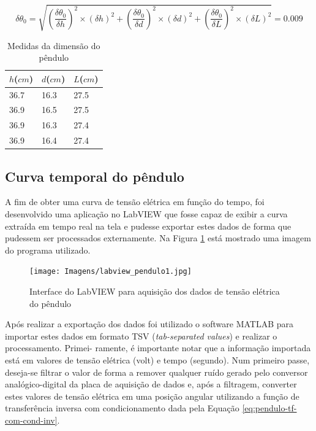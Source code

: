 \documentclass[a4paper]{instrumentacao}
\begin{document}
\begin{equation}
	\delta\theta_{0}= \sqrt{(\dfrac{\delta\theta_{0}}{\delta h})^2 \times (\delta h)^2 + (\dfrac{\delta\theta_{0}}{\delta d})^2 \times (\delta d)^2 + (\dfrac{\delta\theta_{0}}{\delta L})^2 \times (\delta L)^2} = 0.009
	\label{eq:pendulo-incerteza-calculada}
\end{equation}

\begin{table}[H]
\centering
\caption{Medidas da dimensão do pêndulo}
\begin{tabular}{|l|l|l|}
 \hline
 \textbf{$h$($cm$)} & \textbf{$d$($cm$)} & \textbf{$L$($cm$)} \\ \hline

36.7 & 16.3 & 27.5 \\ \hline
36.9 & 16.5 & 27.5 \\ \hline
36.9 & 16.3 & 27.4 \\ \hline
36.9 & 16.4 & 27.4 \\ \hline

\end{tabular}
\label{tab:pendulo-dimensionamento}
\end{table}


\subsection{Curva temporal do pêndulo}

A fim de obter uma curva de tensão elétrica em função do tempo, foi desenvolvido uma aplicação no LabVIEW que fosse capaz de exibir a curva extraída em tempo real na tela e pudesse exportar estes dados de forma que pudessem ser processados externamente. Na Figura \ref{fig:pendulo-LabVIEW} está mostrado uma imagem do programa utilizado.

\begin{figure}[H]
\centering
\texttt{[image: Imagens/labview\_pendulo1.jpg]}
\caption{Interface do LabVIEW para aquisição dos dados de tensão elétrica do pêndulo}
\label{fig:pendulo-LabVIEW}
\end{figure}

Após realizar a exportação dos dados foi utilizado o software MATLAB para importar estes dados em formato TSV (\textit{tab-separated values}) e realizar o processamento. Primei- ramente, é importante notar que a informação importada está em valores de tensão elétrica (volt) e tempo (segundo). Num primeiro passe, deseja-se filtrar o valor de forma a remover qualquer ruído gerado pelo conversor analógico-digital da placa de aquisição de dados e, após a filtragem, converter estes valores de tensão elétrica em uma posição angular utilizando a função de transferência inversa com condicionamento dada pela Equação \ref{eq:pendulo-tf-com-cond-inv}.
\end{document}
